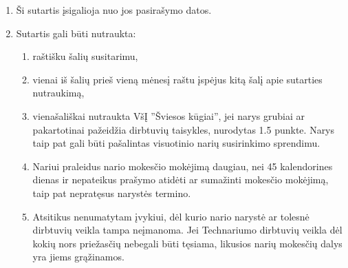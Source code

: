 \documentclass[
  paper=a4,
  fontsize=10pt,
  parskip=full,
  DIV=21,
  BCOR=8mm,
   footinclude=true,
  headheight=2pt,
  footheight=1pt,
  footsepline=true
]{scrartcl}
\begin{document}
\begin{enumerate}
\item Ši sutartis įsigalioja nuo jos pasirašymo datos.
\item Sutartis gali būti nutraukta:
\begin{enumerate}
\item raštišku šalių susitarimu,
\item vienai iš šalių prieš vieną mėnesį raštu įspėjus kitą šalį apie sutarties nutraukimą,
\item vienašališkai nutraukta VšĮ ''Šviesos kūgiai'', jei narys grubiai ar pakartotinai pažeidžia dirbtuvių taisykles, nurodytas 1.5 punkte. Narys taip pat gali būti pašalintas visuotinio narių susirinkimo sprendimu.

\item Nariui praleidus nario mokesčio mokėjimą daugiau, nei 45 kalendorines dienas ir nepateikus prašymo atidėti ar sumažinti mokesčio mokėjimą, taip pat nepratęsus narystės termino.

\item Atsitikus nenumatytam įvykiui, dėl kurio nario narystė ar tolesnė dirbtuvių veikla tampa
neįmanoma. Jei Technariumo dirbtuvių veikla dėl kokių nors priežasčių nebegali būti tęsiama, likusios narių mokesčių dalys yra jiems grąžinamos.
\end{enumerate}  

\end{enumerate} 


\agreementParties

\end{document}
